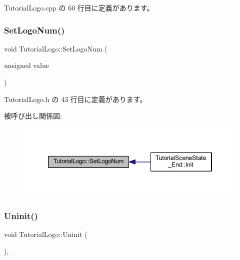  Tutorial\+Logo.\+cpp の 60 行目に定義があります。

\mbox{\label{class_tutorial_logo_a18313074bc7242f5e8a9121414abd51d}} 
\subsubsection{\texorpdfstring{Set\+Logo\+Num()}{SetLogoNum()}}
{\footnotesize\ttfamily void Tutorial\+Logo\+::\+Set\+Logo\+Num (\begin{DoxyParamCaption}\item[{unsigned}]{value }\end{DoxyParamCaption})\hspace{0.3cm}{\ttfamily [inline]}}



 Tutorial\+Logo.\+h の 43 行目に定義があります。

被呼び出し関係図\+:\nopagebreak
\begin{figure}[H]
\begin{center}
\leavevmode
\includegraphics[width=346pt]{class_tutorial_logo_a18313074bc7242f5e8a9121414abd51d_icgraph}
\end{center}
\end{figure}
\mbox{\label{class_tutorial_logo_a8e1f1dba47dadf7d1bb40f616324ffb5}} 
\subsubsection{\texorpdfstring{Uninit()}{Uninit()}}
{\footnotesize\ttfamily void Tutorial\+Logo\+::\+Uninit (\begin{DoxyParamCaption}{ }\end{DoxyParamCaption})\hspace{0.3cm}{\ttfamily [override]}, {\ttfamily [virtual]}}



